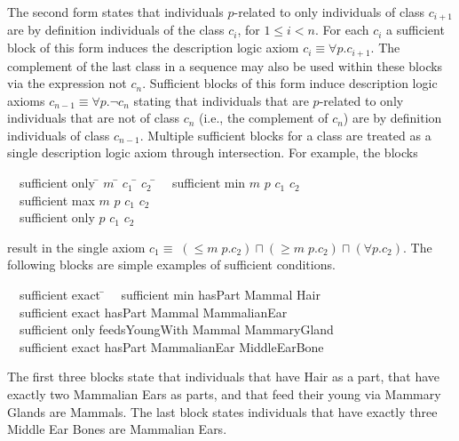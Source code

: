 \documentclass[preprint,number]{elsarticle}
\begin{document}
The second form states that individuals $p$-related to only
individuals of class $c_{i+1}$ are by definition individuals of the
class $c_i$, for $1 \le i < n$. For each $c_i$ a sufficient block of
this form induces the description logic axiom $c_i \equiv \forall p
. c_{i+1}$. The complement of the last class in a sequence may also be
used within these blocks via the expression \textsf{not
  $c_n$}. Sufficient blocks of this form induce description logic
axioms $c_{n-1} \equiv \forall p . \neg c_n$ stating that individuals
that are $p$-related to only individuals that are not of class $c_n$
(i.e., the complement of $c_n$) are by definition individuals of class
$c_{n-1}$.  Multiple sufficient blocks for a class are treated as a
single description logic axiom through intersection. For example, the
blocks
\begin{tabbing}
  ~~\textsf{sufficient} \= \textsf{only} \= $m$ \= $c_1$ \= $c_2$ \= \kill
  ~~\textsf{sufficient} \> \textsf{min} \> $m$ \> $p$ \> $c_1$ \> $c_2$ \\ 
  ~~\textsf{sufficient} \> \textsf{max} \> $m$ \> $p$ \> $c_1$ \> $c_2$ \\ 
  ~~\textsf{sufficient} \> \textsf{only} \> $p$ \> $c_1$ \> $c_2$
\end{tabbing}
result in the single axiom $c_1 \equiv \; (\le m \; p .  c_2) \sqcap
(\ge m \; p . c_2) \sqcap (\forall p.c_2)$. The following blocks are
simple examples of sufficient conditions.
\begin{tabbing}
  ~~\textsf{sufficient} \textsf{exact} \= \kill
  ~~\textsf{sufficient} \textsf{min}  \textsf{hasPart} 
  \textsf{Mammal} \textsf{Hair} \\
  ~~\textsf{sufficient} \textsf{exact}   \textsf{hasPart} 
  \textsf{Mammal} \textsf{MammalianEar} \\
  ~~\textsf{sufficient} \textsf{only} \> \textsf{feedsYoungWith} 
  \textsf{Mammal} \textsf{MammaryGland}\\
  ~~\textsf{sufficient} \textsf{exact}  \textsf{hasPart} 
  \textsf{MammalianEar} \textsf{MiddleEarBone}
\end{tabbing}
The first three blocks state that individuals that have Hair as a
part, that have exactly two Mammalian Ears as parts, and that feed
their young via Mammary Glands are Mammals. The last block states
individuals that have exactly three Middle Ear Bones are Mammalian
Ears.
\end{document}

